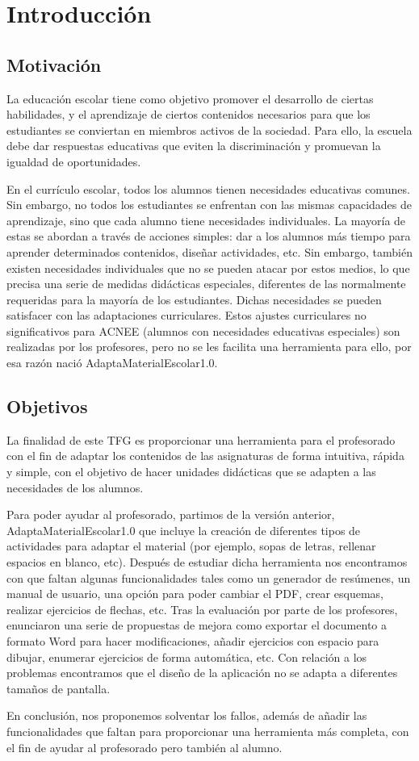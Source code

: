 \chapter{Introducción}
\label{cap:introduccion}

\section{Motivación}
La educación escolar tiene como objetivo promover el desarrollo de ciertas habilidades, y el aprendizaje de ciertos contenidos necesarios para que los estudiantes se conviertan en miembros activos de la sociedad. Para ello, la escuela debe dar respuestas educativas que eviten la discriminación y promuevan la igualdad de oportunidades.

En el currículo escolar, todos los alumnos tienen necesidades educativas comunes. Sin embargo, no todos los estudiantes se enfrentan con las mismas capacidades de aprendizaje, sino que cada alumno tiene necesidades individuales. La mayoría de estas se abordan a través de acciones simples: dar a los alumnos más tiempo para aprender determinados contenidos, diseñar actividades, etc.  Sin embargo, también existen necesidades individuales que no se pueden atacar por estos medios, lo que precisa una serie de medidas didácticas especiales, diferentes de las normalmente requeridas para la mayoría de los estudiantes. Dichas necesidades se pueden satisfacer con las adaptaciones curriculares. Estos ajustes curriculares no significativos para ACNEE (alumnos con necesidades educativas especiales) son realizadas por los profesores, pero no se les facilita una herramienta para ello, por esa razón nació AdaptaMaterialEscolar1.0.

\section{Objetivos}
La finalidad de este TFG es proporcionar una herramienta para el profesorado con el fin de adaptar los contenidos de las asignaturas de forma intuitiva, rápida y simple, con el objetivo de hacer unidades didácticas que se adapten a las necesidades de los alumnos.

Para poder ayudar al profesorado, partimos de la versión anterior, AdaptaMaterialEscolar1.0 que incluye la creación de diferentes tipos de actividades para adaptar el material (por ejemplo, sopas de letras, rellenar espacios en blanco, etc). Después de estudiar dicha herramienta nos encontramos con que faltan algunas funcionalidades tales como un generador de resúmenes, un manual de usuario, una opción para poder cambiar el PDF, crear esquemas, realizar ejercicios de flechas, etc. Tras la evaluación por parte de los profesores, enunciaron una serie de propuestas de mejora como exportar el documento a formato Word para hacer modificaciones, añadir ejercicios con espacio para dibujar, enumerar ejercicios de forma automática, etc. Con relación a los problemas encontramos que el diseño de la aplicación no se adapta a diferentes tamaños de pantalla. 

En conclusión, nos proponemos solventar los fallos, además de añadir las funcionalidades que faltan para proporcionar una herramienta más completa, con el fin de ayudar al profesorado pero también al alumno. 

